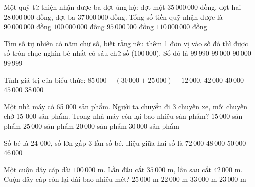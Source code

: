 \begin{ex} %
Một quỹ từ thiện nhận được ba đợt ủng hộ: đợt một $35\,000\,000$ đồng, đợt hai $28\,000\,000$ đồng, đợt ba $37\,000\,000$ đồng. Tổng số tiền quỹ nhận được là
\choice
{$90\,000\,000$ đồng}
{\True $100\,000\,000$ đồng}
{$95\,000\,000$ đồng}
{$110\,000\,000$ đồng}
\end{ex}

\begin{ex} %
Tìm số tự nhiên có năm chữ số, biết rằng nếu thêm 1 đơn vị vào số đó thì được số tròn chục nghìn bé nhất có sáu chữ số ($100\,000$). Số đó là
\choice
{$99\,990$}
{$99\,000$}
{$90\,000$}
{\True $99\,999$}
\end{ex}

\begin{ex} %
Tính giá trị của biểu thức: $85\,000 - (30\,000 + 25\,000) + 12\,000$.
\choice
{\True $42\,000$}
{$40\,000$}
{$45\,000$}
{$38\,000$}
\end{ex}

\begin{ex} %
Một nhà máy có 65 000 sản phẩm. Người ta chuyển đi 3 chuyến xe, mỗi chuyến chở 15 000 sản phẩm. Trong nhà máy còn lại bao nhiêu sản phẩm?
\choice
{$15\,000$ sản phẩm}
{$25\,000$ sản phẩm}
{\True $20\,000$ sản phẩm}
{$30\,000$ sản phẩm}
\end{ex}

\begin{ex} %
Số bé là 24 000, số lớn gấp 3 lần số bé. Hiệu giữa hai số là
\choice
{$72\,000$}
{\True $48\,000$}
{$50\,000$}
{$46\,000$}
\end{ex}

\begin{ex} %
Một cuộn dây cáp dài $100\,000\text{ m}$. Lần đầu cắt $35\,000\text{ m}$, lần sau cắt $42\,000\text{ m}$. Cuộn dây cáp còn lại dài bao nhiêu mét?
\choice
{$25\,000\text{ m}$}
{$22\,000\text{ m}$}
{$33\,000\text{ m}$}
{\True $23\,000\text{ m}$}
\end{ex}

